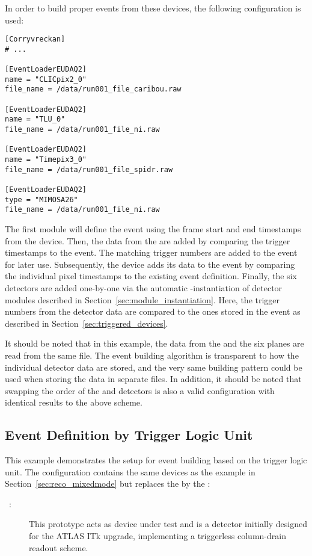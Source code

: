 In order to build proper events from these devices, the following configuration is used:

\begin{verbatim}
[Corryvreckan]
# ...

[EventLoaderEUDAQ2]
name = "CLICpix2_0"
file_name = /data/run001_file_caribou.raw

[EventLoaderEUDAQ2]
name = "TLU_0"
file_name = /data/run001_file_ni.raw

[EventLoaderEUDAQ2]
name = "Timepix3_0"
file_name = /data/run001_file_spidr.raw

[EventLoaderEUDAQ2]
type = "MIMOSA26"
file_name = /data/run001_file_ni.raw
\end{verbatim}

The first module will define the event using the frame start and end timestamps from the  device.
Then, the data from the  are added by comparing the trigger timestamps to the event.
The matching trigger numbers are added to the event for later use.
Subsequently, the  device adds its data to the event by comparing the individual pixel timestamps to the existing event definition.
Finally, the six  detectors are added one-by-one via the automatic -instantiation of detector modules described in Section~\ref{sec:module_instantiation}.
Here, the trigger numbers from the detector data are compared to the ones stored in the event as described in Section~\ref{sec:triggered_devices}.

It should be noted that in this example, the data from the  and the six  planes are read from the same file.
The event building algorithm is transparent to how the individual detector data are stored, and the very same building pattern could be used when storing the data in separate files.
In addition, it should be noted that swapping the order of the  and  detectors is also a valid configuration with identical results to the above scheme.

\subsection{Event Definition by Trigger Logic Unit}
This example demonstrates the setup for event building based on the trigger logic unit.
The configuration contains the same devices as the example in Section~\ref{sec:reco_mixedmode} but replaces the  by the :
\begin{description}
        \item[~\cite{atlaspix}:] This prototype acts as device under test and is a detector initially designed for the ATLAS ITk upgrade, implementing a triggerless column-drain readout scheme.
\end{description}

